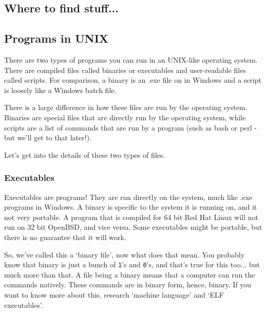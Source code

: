 \subsection {Where to find stuff...} 
		

\subsection {Programs in UNIX}


	There are two types of programs you can run in an UNIX-like operating system.
	There are compiled files called binaries or executables and user-readable 
	files called scripts. For comparison, a binary is an .exe file on in Windows and a script 
	is loosely like a Windows batch file.

	There is a large difference in how these files are run by the operating system.
	Binaries are special files that are directly run by the operating system, while
	scripts are a list of commands that are run by a program (such as bash or 
	perl - but we'll get to that later!).

	Let's get into the details of these two types of files.


\subsubsection {Executables} 

	
	Executables are programs! They are run directly on the system, much like .exe programs
	in Windows. A binary is specific to the system it is running on, and it not very portable.
	A program that is compiled for 64 bit Red Hat Linux will not run on 32 bit OpenBSD, and vice versa.
	Some executables might be portable, but there is no guarantee that it will work. 
	
	So, we've called this a `binary file', now what does that mean. You probably know that 
	binary is just a bunch of {\tt 1}'s and {\tt 0}'s, and that's true for this too... but much
	more than that. A file being a binary means that a computer can run the commands natively. These
	commands are in binary form, hence, binary. If you want to know more about this, research `machine language'
	and `ELF executables'.
	
